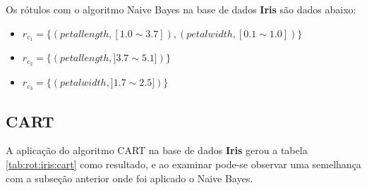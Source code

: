 
Os rótulos com o algoritmo Naive Bayes na base de dados \textbf{Iris} são dados abaixo:
\begin{itemize}[noitemsep]
 \item ${r_{c_1}=\{ (petallength, [ 1.0 \sim 3.7]), (petalwidth,[ 0.1 \sim 1.0 ] ) \} }$  
 \item ${r_{c_2}=\{ (petallength, ] 3.7 \sim 5.1]) \} }$
 \item ${r_{c_3}=\{ (petalwidth, ] 1.7 \sim 2.5 ]) \} }$
\end{itemize}

\subsection{CART} \label{cap:resultados:ssec:iris:cart}

A aplicação do algoritmo CART na base de dados \textbf{Iris} gerou a tabela \ref{tab:rot:iris:cart} como resultado, e ao examinar pode-se observar uma semelhança com a subseção anterior onde foi aplicado o Naive Bayes. 


